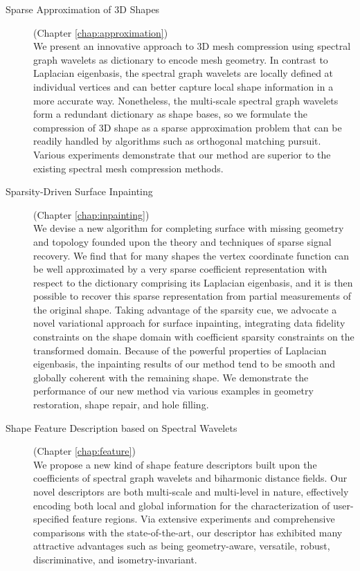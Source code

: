 \begin{description}
  \item[Sparse Approximation of 3D Shapes] (Chapter \ref{chap:approximation})\hfill \\
  We present an innovative approach to 3D mesh compression using spectral graph
wavelets as dictionary to encode mesh geometry. In contrast to
Laplacian eigenbasis, the spectral graph wavelets are locally
defined at individual vertices and can better capture local shape
information in a more accurate way. Nonetheless, the multi-scale
spectral graph wavelets form a redundant dictionary as shape bases,
so we formulate the compression of 3D shape as a sparse
approximation problem that can be readily handled by
algorithms such as orthogonal matching pursuit. Various experiments
demonstrate that our method are superior to the existing spectral
mesh compression methods.

  \item[Sparsity-Driven Surface Inpainting] (Chapter \ref{chap:inpainting}) \hfill \\
  We devise a new algorithm for completing surface with
  missing geometry and topology founded upon the theory and techniques
  of sparse signal recovery. We find that for many shapes the vertex coordinate function
  can be well approximated by a very sparse coefficient representation with respect
  to the dictionary comprising its Laplacian eigenbasis, and it is then possible to
  recover this sparse representation from partial measurements of the original shape.
  Taking advantage of the sparsity cue, we advocate a novel
  variational approach for surface inpainting, integrating data
  fidelity constraints on the shape domain with coefficient sparsity
  constraints on the transformed domain. Because of the powerful
  properties of Laplacian eigenbasis, the inpainting results of our
  method tend to be smooth and globally coherent with the remaining
  shape. We demonstrate the performance of our new method via various
  examples in geometry restoration, shape repair, and hole filling.
  
  \item[Shape Feature Description based on Spectral Wavelets] (Chapter \ref{chap:feature})\hfill \\
  We propose a new kind of shape feature descriptors built upon the
  coefficients of spectral graph wavelets and biharmonic distance fields.
  Our novel descriptors are both multi-scale and multi-level in nature,
  effectively encoding both local and global information
  for the characterization of user-specified feature regions.
  Via extensive experiments and comprehensive comparisons with the state-of-the-art,
  our descriptor has exhibited many attractive advantages such as being geometry-aware,
  versatile, robust, discriminative, and isometry-invariant.
  

\end{description}
